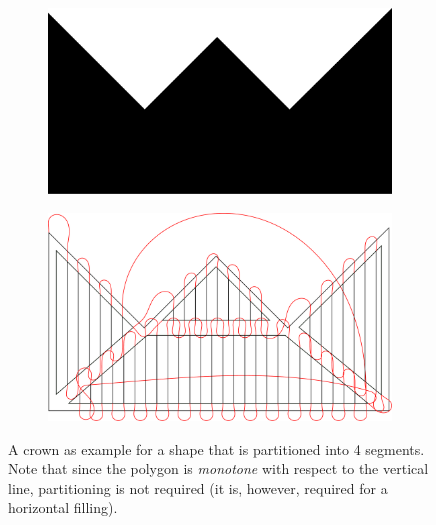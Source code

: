 \begin{figure}[h]

\begin{subfigure}[t]{0.45\textwidth}
\centering
	\includegraphics[width=\textwidth]{images/results/crown.pdf}
\end{subfigure}
\begin{subfigure}[t]{0.45\textwidth}
\centering
	\includegraphics[width=\textwidth]{images/results/crown_gen.pdf}
\end{subfigure}

\caption{A crown as example for a shape that is partitioned into 4 segments. Note that since the polygon is \textit{monotone} with respect to the vertical line, partitioning is not required (it is, however, required for a horizontal filling).}
\end{figure}
